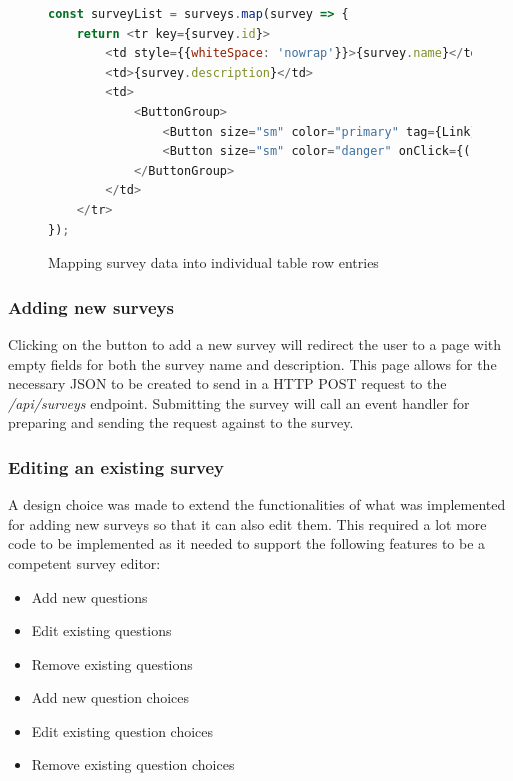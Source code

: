 \begin{figure}[ht]
    \centering
    \begin{lstlisting}[language=JavaScript, escapechar=|]
const surveyList = surveys.map(survey => {
    return <tr key={survey.id}>
        <td style={{whiteSpace: 'nowrap'}}>{survey.name}</td>
        <td>{survey.description}</td>
        <td>
            <ButtonGroup>
                <Button size="sm" color="primary" tag={Link} to={"/surveys/" + survey.id}><MdEdit/></Button>
                <Button size="sm" color="danger" onClick={() => this.remove(survey.id)}><MdDelete/></Button>
            </ButtonGroup>
        </td>
    </tr>
});
    \end{lstlisting}
    \caption{Mapping survey data into individual table row entries}
    \label{surveylistmapping}
\end{figure}  


\subsubsection*{Adding new surveys}
Clicking on the button to add a new survey will redirect the user to a page with empty fields for both the survey name and description.
This page allows for the necessary JSON to be created to send in a HTTP POST request to the \textit{/api/surveys} endpoint.
Submitting the survey will call an event handler for preparing and sending the request against to the survey.



\subsubsection*{Editing an existing survey}
A design choice was made to extend the functionalities of what was implemented for adding new surveys so that it can also edit them.
This required a lot more code to be implemented as it needed to support the following features to be a competent survey editor:
\begin{itemize}
    \tightlist
    \item Add new questions
    \item Edit existing questions
    \item Remove existing questions 
    \item Add new question choices 
    \item Edit existing question choices
    \item Remove existing question choices
\end{itemize}

